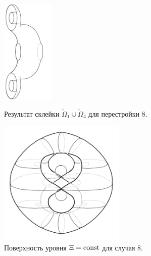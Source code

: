 %
%
\begin{figure}[!htb]
\centering
\includegraphics[width=2.5cm]{images/section2/atoms/atom_8_step.pdf}
    \caption{Результат склейки $\widetilde{\Omega}_1 \cup \widetilde{\Omega}_4$ для перестройки 8.}
    \label{fig:pt9:_atom_8_step}
\endminipage\hfill
{}
\centering
\includegraphics[width=6cm]{images/section2/atoms/atom_8.pdf}
    \caption{Поверхность уровня $\Xi = \mathrm{const}$ для случая 8.}
    \label{fig:pt9:_atom_8}
\endminipage\hfill
\end{figure}


